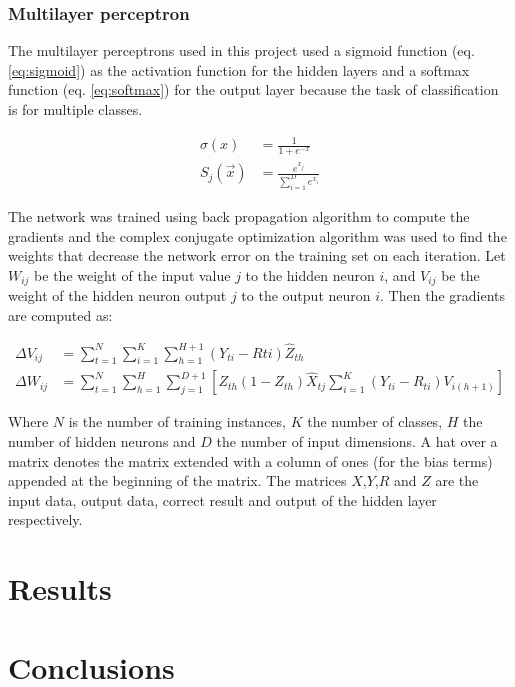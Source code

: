 \documentclass{article}
\begin{document}
\subsubsection{Multilayer perceptron}
The multilayer perceptrons used in this project used a sigmoid function (eq. \ref{eq:sigmoid}) as the
activation function for the hidden layers and a softmax function (eq. \ref{eq:softmax}) for the output layer
because the task of classification is for multiple classes.

\begin{align}
\sigma(x) &= \frac{1}{1+e^{-x}} \label{eq:sigmoid} \\ 
S_j(\vec{x}) &= \frac{e^{x_j}}{\sum_{i=1}^D{e^{x_i}}} \label{eq:softmax}
\end{align}

The network was trained using back propagation algorithm to compute the gradients and the complex conjugate
optimization algorithm was used to find the weights that decrease the network error on the training set on
each iteration. Let $W_{ij}$ be the weight of the input value $j$ to the hidden neuron $i$, and $V_{ij}$ be
the weight of the hidden neuron output $j$ to the output neuron $i$. Then the gradients are computed as:

\begin{align}
\Delta V_{ij} &= \sum_{t=1}^{N}{ \sum_{i=1}^{K}{ \sum_{h=1}^{H+1}{(Y_{ti} - R{ti}) \hat{Z}_{th}} } } \label{eq:gradV} \\ 
\Delta W_{ij} &= \sum_{t=1}^{N}{ \sum_{h=1}^{H}{ \sum_{j=1}^{D+1}{
    \left[ Z_{th}(1 - Z_{th})\hat{X}_{tj} \sum_{i=1}^{K}{ (Y_{ti} - R_{ti})V_{i(h+1)} } \right]
} } } \label{eq:gradW}
\end{align}

Where $N$ is the number of training instances, $K$ the number of classes, $H$ the number of hidden neurons 
and $D$ the number of input dimensions. A hat over a matrix denotes the matrix extended with a column of
ones (for the bias terms) appended at the beginning of the matrix. The matrices $X$,$Y$,$R$ and $Z$ are
the input data, output data, correct result and output of the hidden layer respectively.

\section{Results}

\section{Conclusions}
\end{document}
